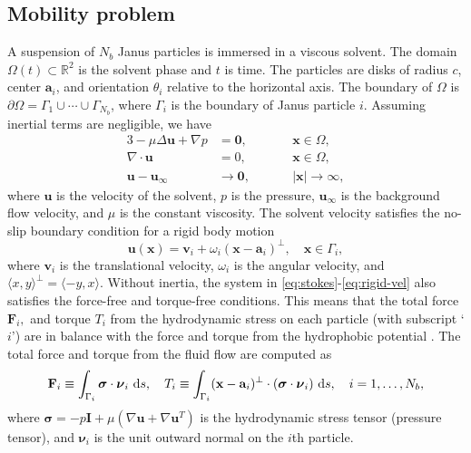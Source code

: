 \documentclass[prb,preprint,showpacs,preprintnumbers,amsmath,amssymb,longbibliography]{revtex4-1}
\renewcommand{\aa}{\mathbf{a}}
\newcommand{\bd}{\partial}
\newcommand{\FF}{\mathbf{F}}
\newcommand{\nnu}{\boldsymbol{\nu}}
\newcommand{\ssigma}{\boldsymbol{\sigma}}
\newcommand{\xx}{\mathbf{x}}
\newcommand{\uu}{\mathbf{u}}
\renewcommand{\vv}{\mathbf{v}}
\begin{document}
\subsection{Mobility problem}
A suspension of $N_b$ Janus particles is immersed in a viscous solvent.
The domain $\Omega(t) \subset \mathbb{R}^2$ is the solvent phase and $t$
is time. The particles are disks of radius $c$, center $\aa_i$, and
orientation $\theta_i$ relative to the horizontal axis. The boundary of
$\Omega$ is $\bd\Omega = \Gamma_1 \cup \cdots \cup \Gamma_{N_b}$, where
$\Gamma_i$ is the boundary of Janus particle $i$. Assuming inertial
terms are negligible, we have 
\begin{alignat}{3}
\label{eq:stokes}
  -\mu \Delta \uu + \nabla p &= \mathbf{0}, && \xx \in \Omega, \\
  \nabla\cdot \uu &= 0, \qquad && \xx \in \Omega, \\
  \uu - \uu_\infty &\to \mathbf{0}, && |\xx| \to \infty,
\end{alignat}
where $\uu$ is the velocity of the solvent, $p$ is the pressure,
$\uu_\infty$ is the background flow velocity, and $\mu$ is the constant
viscosity. The solvent velocity satisfies the no-slip boundary condition
for a rigid body motion
\begin{equation}
  \label{eq:rigid-vel}
  \uu(\xx) = \vv_i + \omega_i (\xx - \aa_i)^\perp, 
    \quad \xx \in \Gamma_i,
\end{equation}
where $\vv_i$ is the translational velocity, $\omega_i$ is the angular
velocity, and $\langle x, y \rangle^{\perp} = \langle -y, x\rangle$. 
Without inertia, the system in \eqref{eq:stokes}-\eqref{eq:rigid-vel} also satisfies the force-free and torque-free conditions.
This means that the total force $\FF_i,$ and torque $T_i$ from the hydrodynamic stress on each particle (with subscript `$i$')
are in balance with the force and torque from the hydrophobic potential \cite{Fu2022_JFM}.
The total force and torque from the fluid flow are computed as
\begin{equation}
  \label{eq:force}
 \FF_i \equiv \int_{\Gamma_i} \ssigma \cdot \nnu_i \, \dif s, \quad
 T_i \equiv \int_{\Gamma_i} (\xx - \aa_i)^\perp \cdot 
  (\ssigma \cdot \nnu_i) \, \dif s,
  \quad i=1,\ldots,N_b,
\end{equation}
where 
$\ssigma = -p \mathbf{I} + \mu \left(\nabla \uu + \nabla \uu^T
\right)$ is the hydrodynamic stress tensor (pressure tensor), and
$\nnu_i$ is the unit outward normal on the $i$th particle.
\end{document}
